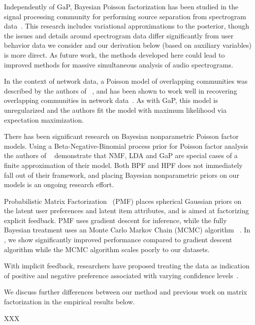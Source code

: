 Independently of GaP, Bayesian Poisson factorization has been studied
in the signal processing community for performing source separation
from spectrogram data~\cite{Cemgil:2009,Hoffman:2012}.  This research
includes variational approximations to the posterior, though the
issues and details around spectrogram data differ significantly from
user behavior data we consider and our derivation below (based on
auxiliary variables) is more direct.  As future work, the methods
developed here could lead to improved methods for massive simultaneous
analysis of audio spectrograms. 

In the context of network data, a Poisson model of overlapping
communities was described by the authors of ~\cite{Ball:2011}, and has
been shown to work well in recovering overlapping communities in
network data~\cite{Gopalan:2013}.  As with GaP, this model is
unregularized and the authors fit the model with maximum likelihood
via expectation maximization.

There has been significant research on Bayesian nonparametric Poisson
factor models. Using a Beta-Negative-Binomial process prior for
Poisson factor analysis the authors of ~\cite{Zhou:2012} demonstrate
that NMF, LDA and GaP are special cases of a finite approximation of
their model. Both BPF and HPF does not immediately fall out of their
framework, and placing Bayesian nonparametric priors on our models is
an ongoing research effort.

Probabilistic Matrix Factorization~\cite{Salakhutdinov:2008a} (PMF)
places spherical Gaussian priors on the latent user preferences and
latent item attributes, and is aimed at factorizing explicit feedback.
PMF uses gradient descent for inference, while the fully Bayesian
treatment uses an Monte Carlo Markov Chain (MCMC) algorithm
~\cite{Salakhutdinov:2008}.  In , we show significantly
improved performance compared to gradient descent algorithm while the
MCMC algorithm scales poorly to our datasets.

With implicit feedback, researchers have proposed treating the data as
indication of positive and negative preference associated with varying
confidence levels~\cite{Hu:2008p9402}.


We discuss further differences between our method and previous work on
matrix factorization in the empirical results below.



XXX \cite{Marlin:2009,Marlin:2012,Elkan:2008,Ma:2011}
